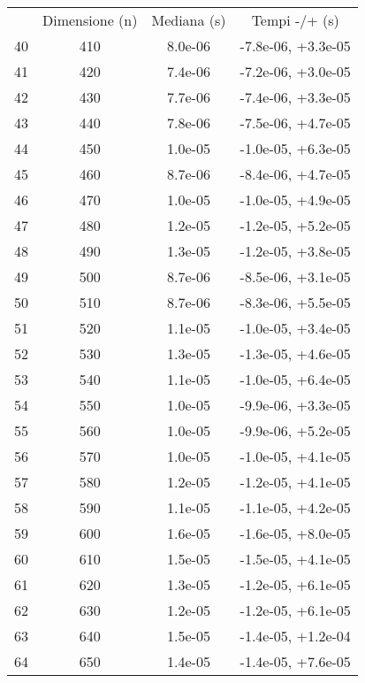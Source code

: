 \begin{table}
\centering
\begin{adjustbox}{width=1\textwidth/2}
\begin{tabular}{|c|c|c|c|}
\hline
 & Dimensione (n) & Mediana (s) & Tempi -/+ (s) \\
40 & 410 & 8.0e-06 & -7.8e-06, +3.3e-05 \\
\cline{1-4}
41 & 420 & 7.4e-06 & -7.2e-06, +3.0e-05 \\
\cline{1-4}
42 & 430 & 7.7e-06 & -7.4e-06, +3.3e-05 \\
\cline{1-4}
43 & 440 & 7.8e-06 & -7.5e-06, +4.7e-05 \\
\cline{1-4}
44 & 450 & 1.0e-05 & -1.0e-05, +6.3e-05 \\
\cline{1-4}
45 & 460 & 8.7e-06 & -8.4e-06, +4.7e-05 \\
\cline{1-4}
46 & 470 & 1.0e-05 & -1.0e-05, +4.9e-05 \\
\cline{1-4}
47 & 480 & 1.2e-05 & -1.2e-05, +5.2e-05 \\
\cline{1-4}
48 & 490 & 1.3e-05 & -1.2e-05, +3.8e-05 \\
\cline{1-4}
49 & 500 & 8.7e-06 & -8.5e-06, +3.1e-05 \\
\cline{1-4}
50 & 510 & 8.7e-06 & -8.3e-06, +5.5e-05 \\
\cline{1-4}
51 & 520 & 1.1e-05 & -1.0e-05, +3.4e-05 \\
\cline{1-4}
52 & 530 & 1.3e-05 & -1.3e-05, +4.6e-05 \\
\cline{1-4}
53 & 540 & 1.1e-05 & -1.0e-05, +6.4e-05 \\
\cline{1-4}
54 & 550 & 1.0e-05 & -9.9e-06, +3.3e-05 \\
\cline{1-4}
55 & 560 & 1.0e-05 & -9.9e-06, +5.2e-05 \\
\cline{1-4}
56 & 570 & 1.0e-05 & -1.0e-05, +4.1e-05 \\
\cline{1-4}
57 & 580 & 1.2e-05 & -1.2e-05, +4.1e-05 \\
\cline{1-4}
58 & 590 & 1.1e-05 & -1.1e-05, +4.2e-05 \\
\cline{1-4}
59 & 600 & 1.6e-05 & -1.6e-05, +8.0e-05 \\
\cline{1-4}
60 & 610 & 1.5e-05 & -1.5e-05, +4.1e-05 \\
\cline{1-4}
61 & 620 & 1.3e-05 & -1.2e-05, +6.1e-05 \\
\cline{1-4}
62 & 630 & 1.2e-05 & -1.2e-05, +6.1e-05 \\
\cline{1-4}
63 & 640 & 1.5e-05 & -1.4e-05, +1.2e-04 \\
\cline{1-4}
64 & 650 & 1.4e-05 & -1.4e-05, +7.6e-05 \\

\end{tabular}
\end{adjustbox}
\end{table}
